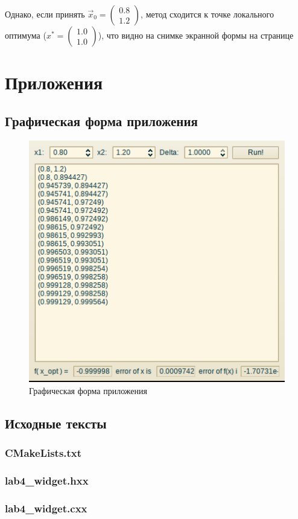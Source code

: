 \documentclass[a4paper,12pt,notitlepage,headsepline,pdftex]{scrartcl}
\begin{document}
  Однако, если принять $\displaystyle \vec{x}_0 = \left( \begin{matrix}
    0.8\\
    1.2
  \end{matrix}\right)$, метод сходится к точке локального оптимума ($x^\ast =
  \left( \begin{matrix}
    1.0\\
    1.0
  \end{matrix}\right)$), что видно на снимке экранной формы на
  странице~\pageref{fig:gui}
  \newpage
\section{Приложения}
  \subsection{Графическая форма приложения}
    \begin{figure}[h!]
      \begin{center}
        \includegraphics[scale=0.86]{scr.png}
      \end{center}
      \caption{Графическая форма приложения}
      \label{fig:gui}
    \end{figure}
  \subsection{Исходные тексты}
    \subsubsection{CMakeLists.txt}
      
    \subsubsection{lab4\_widget.hxx}
      
    \subsubsection{lab4\_widget.cxx}
      
\end{document}
